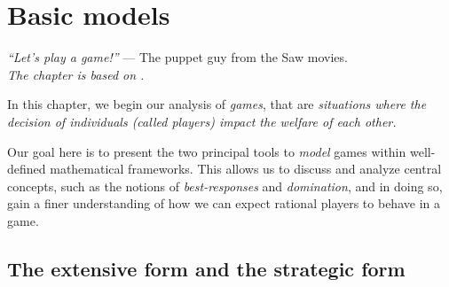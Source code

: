 \ifx \globalmark \undefined %
	
\else
\fi




\chapter{Basic models} \label{chap:Models}
{\large{\itshape
``Let's play a game!''} --- The puppet guy from the Saw movies.\\
}
{\small{\itshape
The chapter is based on \cite[pages 37 to 74]{MyGTAO}.}\\
}


In this chapter, we begin our analysis of \emph{games}, that are \emph{situations where the decision of individuals (called players) impact the welfare of each other.}

Our goal here is to present the two principal tools to \emph{model} games within well-defined mathematical frameworks.
This allows us to discuss and analyze central concepts, such as the notions of \emph{best-responses} and \emph{domination}, and in doing so,
gain a finer understanding of how we can expect rational players to behave in a game.



\section{The extensive form and the strategic form}

